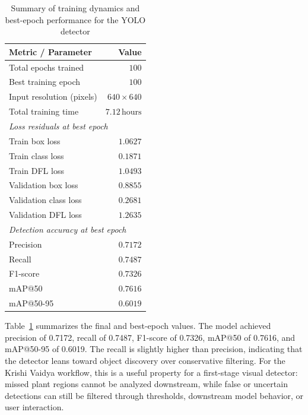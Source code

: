 \begin{table}[H]
  \centering
  \caption{Summary of training dynamics and best-epoch performance for the YOLO detector}
  \label{tab:yolo-training-dynamics-summary}
  \begin{tabular}{lr}
    \toprule
    \textbf{Metric / Parameter} & \textbf{Value} \\
    \midrule
    Total epochs trained & $100$ \\
    Best training epoch & $100$ \\
    Input resolution (pixels) & $640 \times 640$ \\
    Total training time & $7.12\,\text{hours}$ \\
    \midrule
    \multicolumn{2}{l}{\textit{Loss residuals at best epoch}} \\
    Train box loss & $1.0627$ \\
    Train class loss & $0.1871$ \\
    Train DFL loss & $1.0493$ \\
    Validation box loss & $0.8855$ \\
    Validation class loss & $0.2681$ \\
    Validation DFL loss & $1.2635$ \\
    \midrule
    \multicolumn{2}{l}{\textit{Detection accuracy at best epoch}} \\
    Precision & $0.7172$ \\
    Recall & $0.7487$ \\
    F1-score & $0.7326$ \\
    mAP@50 & $0.7616$ \\
    mAP@50-95 & $0.6019$ \\
    \bottomrule
  \end{tabular}
\end{table}


Table~\ref{tab:yolo-training-dynamics-summary} summarizes the final and best-epoch values. The
model achieved precision of 0.7172, recall of 0.7487, F1-score of 0.7326, mAP@50 of 0.7616, and
mAP@50-95 of 0.6019. The recall is slightly higher than precision, indicating that the detector
leans toward object discovery over conservative filtering. For the Krishi Vaidya workflow, this
is a useful property for a first-stage visual detector: missed plant regions cannot be analyzed
downstream, while false or uncertain detections can still be filtered through thresholds,
downstream model behavior, or user interaction.

